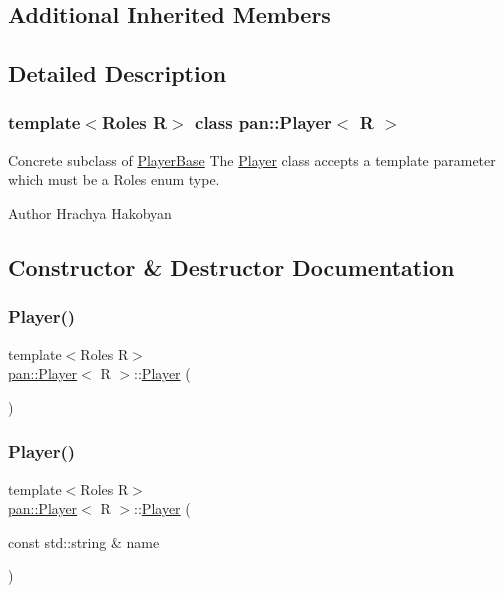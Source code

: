 \subsection*{Additional Inherited Members}


\subsection{Detailed Description}
\subsubsection*{template$<$Roles R$>$\newline
class pan\+::\+Player$<$ R $>$}

Concrete subclass of \hyperlink{classpan_1_1_player_base}{Player\+Base} The \hyperlink{classpan_1_1_player}{Player} class accepts a template parameter which must be a Roles enum type. 

\begin{DoxyAuthor}{Author}
Hrachya Hakobyan 
\end{DoxyAuthor}


\subsection{Constructor \& Destructor Documentation}
\mbox{\label{classpan_1_1_player_a107eee283242e1a091c19bf801ace02e}} 
\subsubsection{\texorpdfstring{Player()}{Player()}\hspace{0.1cm}{\footnotesize\ttfamily [1/2]}}
{\footnotesize\ttfamily template$<$Roles R$>$ \\
\hyperlink{classpan_1_1_player}{pan\+::\+Player}$<$ R $>$\+::\hyperlink{classpan_1_1_player}{Player} (\begin{DoxyParamCaption}{ }\end{DoxyParamCaption})}

\mbox{\label{classpan_1_1_player_a342d676058285ed15edcb47fc233594b}} 
\subsubsection{\texorpdfstring{Player()}{Player()}\hspace{0.1cm}{\footnotesize\ttfamily [2/2]}}
{\footnotesize\ttfamily template$<$Roles R$>$ \\
\hyperlink{classpan_1_1_player}{pan\+::\+Player}$<$ R $>$\+::\hyperlink{classpan_1_1_player}{Player} (\begin{DoxyParamCaption}\item[{const std\+::string \&}]{name }\end{DoxyParamCaption})}

